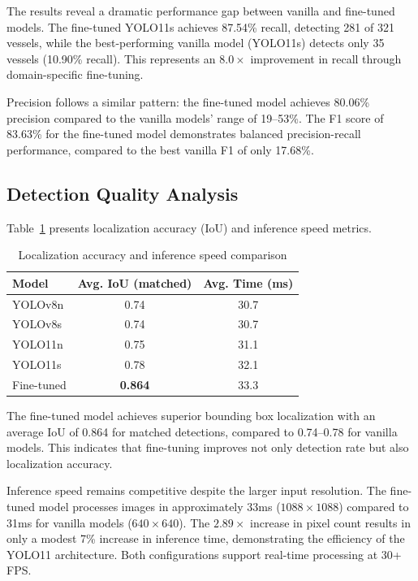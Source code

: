 \documentclass[pdflatex,sn-mathphys-num,Numbered]{sn-jnl}
\begin{document}
The results reveal a dramatic performance gap between vanilla and fine-tuned models. The fine-tuned YOLO11s achieves 87.54\% recall, detecting 281 of 321 vessels, while the best-performing vanilla model (YOLO11s) detects only 35 vessels (10.90\% recall). This represents an $8.0\times$ improvement in recall through domain-specific fine-tuning.

Precision follows a similar pattern: the fine-tuned model achieves 80.06\% precision compared to the vanilla models' range of 19--53\%. The F1 score of 83.63\% for the fine-tuned model demonstrates balanced precision-recall performance, compared to the best vanilla F1 of only 17.68\%.

\subsection{Detection Quality Analysis}\label{subsec:quality-analysis}

Table~\ref{tab:iou_time} presents localization accuracy (IoU) and inference speed metrics.

\begin{table}[!ht]
\centering
\caption{Localization accuracy and inference speed comparison}\label{tab:iou_time}
\begin{tabular}{lcc}
\toprule
\textbf{Model} & \textbf{Avg. IoU (matched)} & \textbf{Avg. Time (ms)} \\
\midrule
YOLOv8n & 0.74 & 30.7 \\
YOLOv8s & 0.74 & 30.7 \\
YOLO11n & 0.75 & 31.1 \\
YOLO11s & 0.78 & 32.1 \\
Fine-tuned & \textbf{0.864} & 33.3 \\
\bottomrule
\end{tabular}
\end{table}

The fine-tuned model achieves superior bounding box localization with an average IoU of 0.864 for matched detections, compared to 0.74--0.78 for vanilla models. This indicates that fine-tuning improves not only detection rate but also localization accuracy.

Inference speed remains competitive despite the larger input resolution. The fine-tuned model processes images in approximately 33ms ($1088 \times 1088$) compared to 31ms for vanilla models ($640 \times 640$). The $2.89\times$ increase in pixel count results in only a modest 7\% increase in inference time, demonstrating the efficiency of the YOLO11 architecture. Both configurations support real-time processing at 30+ FPS.
\end{document}
